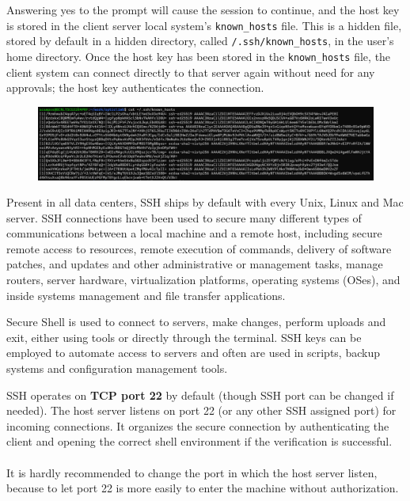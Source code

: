 \documentclass{article}
\newenvironment{blocktemplateI}[1]{%
    \tcolorbox[beamer,%
    noparskip,breakable,
    colframe=Violet,%
    colbacklower=Black,%
    title=#1]}%
    {\endtcolorbox}
\begin{document}
Answering yes to the prompt will cause the session to continue, and the host key is stored in the client server local system's \verb|known_hosts| file. This is a hidden file, stored by default in a hidden directory, called \verb|/.ssh/known_hosts|, in the user's home directory. Once the host key has been stored in the \verb|known_hosts| file, the client system can connect directly to that server again without need for any approvals; the host key authenticates the connection.

\begin{figure}[H]
    \includegraphics[width=\textwidth]{pictures/ssh1.png}
    \centering
\end{figure}

Present in all data centers, SSH ships by default with every Unix, Linux and Mac server. SSH connections have been used to secure many different types of communications between a local machine and a remote host, including secure remote access to resources, remote execution of commands, delivery of software patches, and updates and other administrative or management tasks, manage routers, server hardware, virtualization platforms, operating systems (OSes), and inside systems management and file transfer applications.

Secure Shell is used to connect to servers, make changes, perform uploads and exit, either using tools or directly through the terminal. SSH keys can be employed to automate access to servers and often are used in scripts, backup systems and configuration management tools.

\begin{blocktemplateI}{Note}

SSH operates on \textbf{TCP port 22} by default (though SSH port can be changed if needed). The host server listens on port 22 (or any other SSH assigned port) for incoming connections. It organizes the secure connection by authenticating the client and opening the correct shell environment if the verification is successful.
\\\\
It is hardly recommended to change the port in which the host server listen, because to let port 22 is more easily to enter the machine without authorization.
\end{blocktemplateI}
\end{document}
